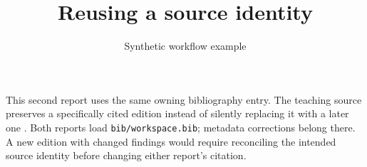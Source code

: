 \documentclass[11pt]{article}
\title{Reusing a source identity}
\author{Synthetic workflow example}
\date{}
\begin{document}
\maketitle
This second report uses the same owning bibliography entry. The teaching source
preserves a specifically cited edition instead of silently replacing it with a
later one \cite[sec.~Identity]{work:example-evidence-v1}.
Both reports load \texttt{bib/workspace.bib}; metadata corrections belong there.
A new edition with changed findings would require reconciling the intended
source identity before changing either report's citation.
\printbibliography
\end{document}

